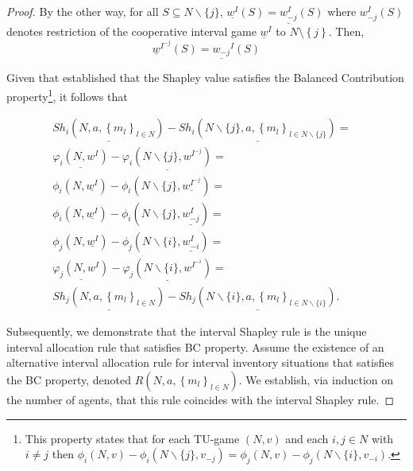 \documentclass[12pt]{article}
\begin{document}
\begin{proof}

By the other way, for all $S\subseteq N\backslash\{j\}$, $%
\underline{w^{I}}\left( S\right) =\underline{w_{-j}^{I}}\left( S\right) $ where $%
w_{-j}^{I}\left( S\right) $ denotes restriction of the cooperative
interval game $\underline{w}^{I}$ to $N\setminus \left\{ j\right\} .$ Then,%
\begin{equation}
\label{eq.1.}
\underline{w}^{I^{-j}}\left( S\right) =\underline{w_{-j}}^{I}\left( S\right)
\end{equation}%

Given that \cite {Myerson1980} established that the Shapley value satisfies the Balanced Contribution property\footnote{This property states that for each TU-game $(N,v)$ and each $i,j\in N$ with $i\neq j$ then $\phi_i(N,v)-\phi_i(N\backslash\{j\},v_{-j})=\phi_j(N,v)-\phi_j(N\backslash\{i\},v_{-i})$.}, it follows that

\begin{eqnarray*}
\underline{Sh_{i}\left( N,a,\left\{ m_{l}\right\} _{l\in N}\right)} -\underline{Sh_{i}\left( N\backslash\{j\},a,\left\{ m_{l}\right\} _{l\in N\backslash\{j\}}\right)} =&\\
\underline{\varphi
_{i}(N,w^I)}-\underline{\varphi _{i}(N\backslash\{j\} ,w^{I^{-j}})} =&
\\
 \phi_{i} (N,\underline{w^{I}})
- \phi_{i} (N\backslash\{j\} ,\underline{w^{I^{-j}}}) =&\\
 \phi_{i} (N,\underline{w^{I}})
- \phi_{i} (N\backslash\{j\} ,\underline{w^{I}_{-j}})=& \\
 \phi_{j} (N,\underline{w^{I}})
- \phi_{j} (N\backslash\{i\} ,\underline{w^{I}_{-i}}) =&\\
 \underline{\varphi
_{j}(N,w^{I})}-\underline{\varphi _{j}(N\backslash\{i\} ,w^{I^{-i}})} =&\\
 \underline{Sh_{j}\left( N,a,\left\{ m_{l}\right\} _{l\in N}\right)} -\underline{Sh_{j}\left( N\backslash\{i\},a,\left\{ m_{l}\right\} _{l\in N\backslash\{i\}}\right)}.  
\end{eqnarray*}

\noindent Subsequently, we demonstrate that the interval Shapley rule is the unique interval allocation rule that satisfies BC property. Assume the existence of an alternative interval allocation rule for interval inventory situations that satisfies the BC property, denoted $R\left( N,a,\left\{ m_{l}\right\} _{l\in N}\right)$. We establish, via induction on the number of agents, that this rule coincides with the interval Shapley rule.


\end{proof}
\end{document}
